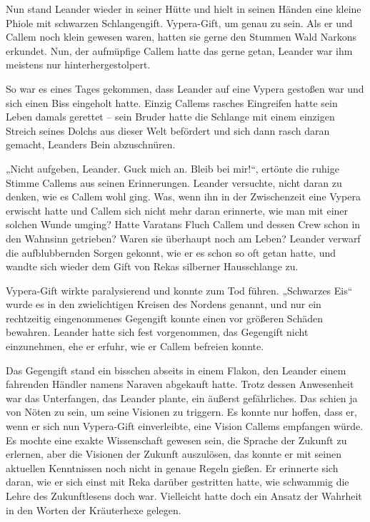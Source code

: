 \documentclass[10pt, a4paper, oneside]{book}
\begin{document}
Nun stand Leander wieder in seiner Hütte und hielt in seinen Händen eine kleine Phiole mit schwarzen Schlangengift. Vypera-Gift, um genau zu sein. Als er und Callem noch klein gewesen waren, hatten sie gerne den Stummen Wald Narkons erkundet. Nun, der aufmüpfige Callem hatte das gerne getan, Leander war ihm meistens nur hinterhergestolpert.

So war es eines Tages gekommen, dass Leander auf eine Vypera gestoßen war und sich einen Biss eingeholt hatte. Einzig Callems rasches Eingreifen hatte sein Leben damals gerettet – sein Bruder hatte die Schlange mit einem einzigen Streich seines Dolchs aus dieser Welt befördert und sich dann rasch daran gemacht, Leanders Bein abzuschnüren.

„Nicht aufgeben, Leander. Guck mich an. Bleib bei mir!“, ertönte die ruhige Stimme Callems aus seinen Erinnerungen. Leander versuchte, nicht daran zu denken, wie es Callem wohl ging. Was, wenn ihn in der Zwischenzeit eine Vypera erwischt hatte und Callem sich nicht mehr daran erinnerte, wie man mit einer solchen Wunde umging? Hatte Varatans Fluch Callem und dessen Crew schon in den Wahnsinn getrieben? Waren sie überhaupt noch am Leben? Leander verwarf die aufblubbernden Sorgen gekonnt, wie er es schon so oft getan hatte, und wandte sich wieder dem Gift von Rekas silberner Hausschlange zu.

Vypera-Gift wirkte paralysierend und konnte zum Tod führen. „Schwarzes Eis“ wurde es in den zwielichtigen Kreisen des Nordens genannt, und nur ein rechtzeitig eingenommenes Gegengift konnte einen vor größeren Schäden bewahren. Leander hatte sich fest vorgenommen, das Gegengift nicht einzunehmen, ehe er erfuhr, wie er Callem befreien konnte.

Das Gegengift stand ein bisschen abseits in einem Flakon, den Leander einem fahrenden Händler namens Naraven abgekauft hatte. Trotz dessen Anwesenheit war das Unterfangen, das Leander plante, ein äußerst gefährliches. Das schien ja von Nöten zu sein, um seine Visionen zu triggern. Es konnte nur hoffen, dass er, wenn er sich nun Vypera-Gift einverleibte, eine Vision Callems empfangen würde. Es mochte eine exakte Wissenschaft gewesen sein, die Sprache der Zukunft zu erlernen, aber die Visionen der Zukunft auszulösen, das konnte er mit seinen aktuellen Kenntnissen noch nicht in genaue Regeln gießen. Er erinnerte sich daran, wie er sich einst mit Reka darüber gestritten hatte, wie schwammig die Lehre des Zukunftlesens doch war. Vielleicht hatte doch ein Ansatz der Wahrheit in den Worten der Kräuterhexe gelegen.
\end{document}
